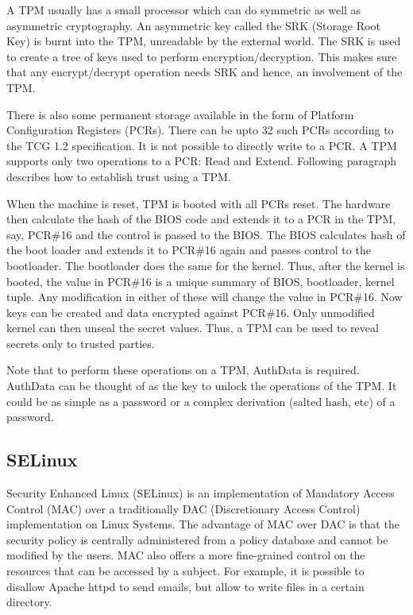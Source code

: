 \documentclass[10pt,twocolumn,pdftex]{article}
\begin{document}
A TPM usually has a small processor which can do symmetric as well as asymmetric cryptography. An asymmetric key called the SRK (Storage Root Key) is burnt into the TPM, unreadable by the external world. The SRK is used to create a tree of keys used to perform encryption/decryption. This makes sure that any encrypt/decrypt operation needs SRK and hence, an involvement of the TPM.

There is also some permanent storage available in the form of Platform Configuration Registers (PCRs). There can be upto 32 such PCRs according to the TCG 1.2 specification. It is not possible to directly write to a PCR. A TPM supports only two operations to a PCR: Read and Extend. Following paragraph describes how to establish trust using a TPM.

When the machine is reset, TPM is booted with all PCRs reset. The hardware then calculate the hash of the BIOS code and extends it to a PCR in the TPM, say, PCR\#16 and the control is passed to the BIOS. The BIOS calculates hash of the boot loader and extends it to PCR\#16 again and passes control to the bootloader. The bootloader does the same for the kernel. Thus, after the kernel is booted, the value in PCR\#16 is a unique summary of {BIOS, bootloader, kernel} tuple. Any modification in either of these will change the value in PCR\#16. Now keys can be created and data encrypted against PCR\#16. Only unmodified kernel can then unseal the secret values. Thus, a TPM can be used to reveal secrets only to trusted parties. 

Note that to perform these operations on a TPM, AuthData is required. AuthData can be thought of as the key to unlock the operations of the TPM. It could be as simple as a password or a complex derivation (salted hash, etc) of a password. 

\subsection{SELinux}
Security Enhanced Linux (SELinux) \cite{SELinux} is an implementation of Mandatory Access Control (MAC) over a traditionally DAC (Discretionary Access Control) implementation on Linux Systems. The advantage of MAC over DAC is that the security policy is centrally administered from a policy database and cannot be modified by the users. MAC also offers a more fine-grained control on the resources that can be accessed by a subject. For example, it is possible to disallow Apache httpd to send emails, but allow to write files in a certain directory.
\end{document}
